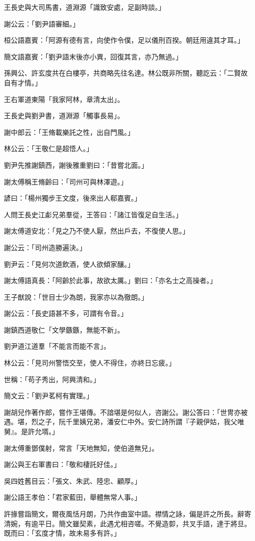 王長史與大司馬書，道淵源「識致安處，足副時談。」

謝公云：「劉尹語審細。」

桓公語嘉賓：「阿源有德有言，向使作令僕，足以儀刑百揆。朝廷用違其才耳。」

簡文語嘉賓：「劉尹語末後亦小異，回復其言，亦乃無過。」

孫興公、許玄度共在白樓亭，共商略先往名達。林公既非所關，聽訖云：「二賢故自有才情。」

王右軍道東陽「我家阿林，章清太出」。

王長史與劉尹書，道淵源「觸事長易」。

謝中郎云：「王脩載樂託之性，出自門風。」

林公云：「王敬仁是超悟人。」

劉尹先推謝鎮西，謝後雅重劉曰：「昔嘗北面。」

謝太傅稱王脩齡曰：「司州可與林澤遊。」

諺曰：「楊州獨步王文度，後來出人郗嘉賓。」

人問王長史江虨兄弟羣從，王答曰：「諸江皆復足自生活。」

謝太傅道安北：「見之乃不使人厭，然出戶去，不復使人思。」

謝公云：「司州造勝遍決。」

劉尹云：「見何次道飲酒，使人欲傾家釀。」

謝太傅語真長：「阿齡於此事，故欲太厲。」劉曰：「亦名士之高操者。」

王子猷說：「世目士少為朗，我家亦以為徹朗。」

謝公云：「長史語甚不多，可謂有令音。」

謝鎮西道敬仁「文學鏃鏃，無能不新」。

劉尹道江道羣「不能言而能不言」。

林公云：「見司州警悟交至，使人不得住，亦終日忘疲。」

世稱：「苟子秀出，阿興清和。」

簡文云：「劉尹茗柯有實理。」

謝胡兒作著作郎，嘗作王堪傳。不諳堪是何似人，咨謝公。謝公答曰：「世冑亦被遇。堪，烈之子，阮千里姨兄弟，潘安仁中外。安仁詩所謂『子親伊姑，我父唯舅』。是許允壻。」

謝太傅重鄧僕射，常言「天地無知，使伯道無兒」。

謝公與王右軍書曰：「敬和棲託好佳。」

吳四姓舊目云：「張文、朱武、陸忠、顧厚。」

謝公語王孝伯：「君家藍田，舉體無常人事。」

許掾嘗詣簡文，爾夜風恬月朗，乃共作曲室中語。襟情之詠，偏是許之所長。辭寄清婉，有逾平日。簡文雖契素，此遇尤相咨嗟。不覺造厀，共叉手語，達于將旦。既而曰：「玄度才情，故未易多有許。」

